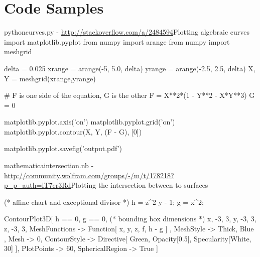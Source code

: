 \documentclass{article}
\begin{document}

\section{Code Samples}
\label{sec:code_samples}

\begin{TMcode}{python}{curves.py - \url{http://stackoverflow.com/a/2484594}}{Plotting algebraic curves}
import matplotlib.pyplot
from numpy import arange
from numpy import meshgrid

delta = 0.025
xrange = arange(-5, 5.0, delta)
yrange = arange(-2.5, 2.5, delta)
X, Y = meshgrid(xrange,yrange)

# F is one side of the equation, G is the other
F = X**2*(1 - Y**2 - X*Y**3)
G = 0

matplotlib.pyplot.axis('on')
matplotlib.pyplot.grid('on')
matplotlib.pyplot.contour(X, Y, (F - G), [0])

matplotlib.pyplot.savefig('output.pdf')
\end{TMcode}

\clearpage
\begin{TMcode}{mathematica}{intersection.nb - \url{http://community.wolfram.com/groups/-/m/t/178218?p_p_auth=lT7er3Rd}}{Plotting the intersection between to surfaces}

(* affine chart and exceptional divisor *)
h = z^2 y - 1;
g = x^2;

ContourPlot3D[
    {h == 0, g == 0}, 
    (* bounding box dimensions *)
    {x, -3, 3}, 
    {y, -3, 3}, 
    {z, -3, 3}, 
    MeshFunctions -> {
        Function[ {x, y, z, f}, h - g ]
    }, 
    MeshStyle -> {
        { Thick, Blue }
    }, 
    Mesh -> {{0}}, 
    ContourStyle -> Directive[
            Green, Opacity[0.5], Specularity[White, 30]
    ], 
    PlotPoints -> 60,
    SphericalRegion -> True
]
\end{TMcode}

\printindex
\end{document}

